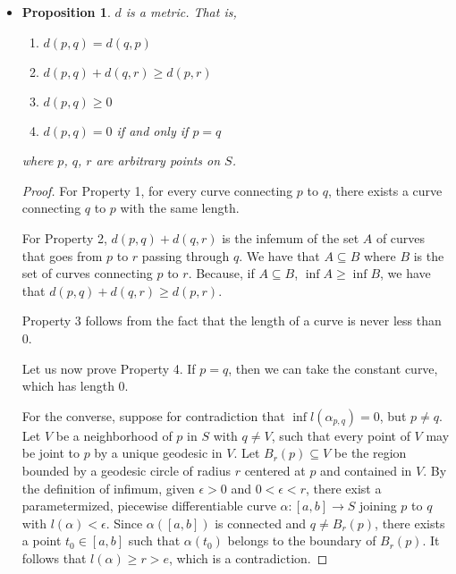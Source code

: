 \documentclass[10pt]{article}
\newtheorem{proposition}[lemma]{Proposition}
\newcommand{\ra}{\rightarrow}
\newcommand{\sseq}{\subseteq}
\begin{document}
\begin{itemize}
    \item \begin{proposition}
      $d$ is a metric. That is,
      \begin{enumerate}
        \item $d(p,q) = d(q,p)$\\
        \item $d(p,q) + d(q,r) \geq d(p,r)$\\
        \item $d(p,q) \geq 0$\\
        \item $d(p,q) = 0$ if and only if $p = q$
      \end{enumerate}
      where $p$, $q$, $r$ are arbitrary points on $S$.
    \end{proposition}
    \begin{proof}
      For Property 1, for every curve connecting $p$ to $q$, there exists a curve connecting $q$ to $p$ with the same length.

      For Property 2, $d(p,q) + d(q,r)$ is the infemum of the set $A$ of curves that goes from $p$ to $r$ passing through $q$. We have that $A \sseq B$ where $B$ is the set of curves connecting $p$ to $r$. Because, if $A \sseq B$, $\inf A \geq \inf B$, we have that $d(p,q) + d(q, r) \geq d(p,r)$.

      Property 3 follows from the fact that the length of a curve is never less than 0.

      Let us now prove Property 4. If $p = q$, then we can take the constant curve, which has length $0$.

      For the converse, suppose for contradiction that $\inf l(\alpha_{p,q}) = 0$, but $p \neq q$. Let $V$ be a neighborhood of $p$ in $S$ with $q \neq V$, such that every point of $V$ may be joint to $p$ by a unique geodesic in $V$. Let $B_r(p) \sseq V$ be the region bounded by a geodesic circle of radius $r$ centered at $p$ and contained in $V$. By the definition of infimum, given $\epsilon > 0$ and $0 < \epsilon < r$, there exist a parametermized, piecewise differentiable curve $\alpha : [a,b] \ra S$ joining $p$ to $q$ with $l(\alpha) < \epsilon$. Since $\alpha([a,b])$ is connected and $q \neq B_r(p)$, there exists a point $t_0 \in [a,b]$ such that $\alpha(t_0)$ belongs to the  boundary of $B_r(p)$. It follows that $l(\alpha) \geq r > e$, which is a contradiction.
    \end{proof}


\end{itemize}
\end{document}
